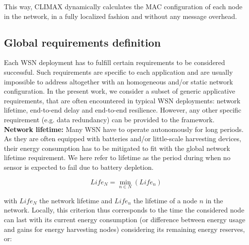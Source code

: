 \documentclass[12pt,journal,compsoc]{IEEEtran}
\begin{document}
This way, CLIMAX dynamically calculates the MAC configuration of each node in the network, in a fully localized fashion and without any message overhead.


\subsection{Global requirements definition}

Each WSN deployment has to fulfill certain requirements to be considered successful. Such requirements are specific to each application and are usually impossible to address altogether with an homogeneous and/or static network configuration.
In the present work, we consider a subset of generic applicative requirements, that are often encountered in typical WSN deployments: network lifetime, end-to-end delay and end-to-end resilience. However, any other specific requirement (e.g. data redundancy) can be provided to the framework.\\

\textbf{Network lifetime:} Many WSN have to operate autonomously for long periods. As they are often equipped with batteries and/or little-scale harvesting devices, their energy consumption has to be mitigated to fit with the global network lifetime requirement. We here refer to lifetime as the period during when no sensor is expected to fail due to battery depletion.

\begin{small}
\[
Life_{N} = \min_{n \in N} (Life_{n})
\]
\end{small}

with $Life_{N}$ the network lifetime and $Life_{n}$ the lifetime of a node $n$ in the network. Locally, this criterion thus corresponds to the time the considered node can last with its current energy consumption (or difference between energy usage and gains for energy harvesting nodes) considering its remaining energy reserves, or:
\end{document}
